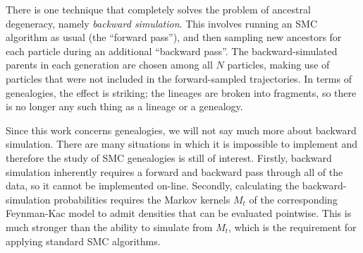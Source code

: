 There is one technique that completely solves the problem of ancestral degeneracy, namely \emph{backward simulation}\seb{[citation]}. This involves running an SMC algorithm as usual (the ``forward pass''), and then sampling new ancestors for each particle during an additional ``backward pass''. 
The backward-simulated parents in each generation are chosen among all $N$ particles, making use of particles that were not included in the forward-sampled trajectories.
In terms of genealogies, the effect is striking; the lineages are broken into fragments, so there is no longer any such thing as a lineage or a genealogy.

Since this work concerns genealogies, we will not say much more about backward simulation. There are many situations in which it is impossible to implement and therefore the study of SMC genealogies is still of interest. 
Firstly, backward simulation inherently requires a forward and backward pass through all of the data, so it cannot be implemented on-line. 
Secondly, calculating the backward-simulation probabilities requires the Markov kernels $M_t$ of the corresponding Feynman-Kac model to admit densities that can be evaluated pointwise. This is much stronger than the ability to simulate from $M_t$, which is the requirement for applying standard SMC algorithms.




